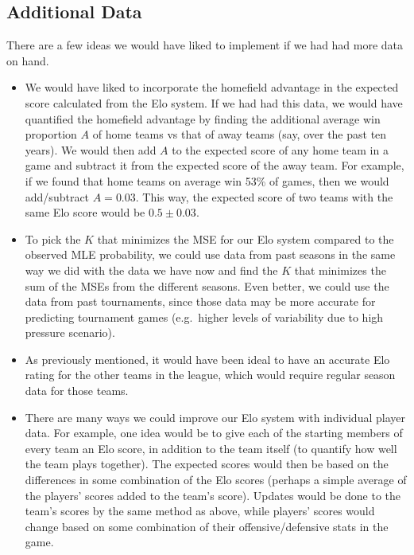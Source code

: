\documentclass{article}
\begin{document}
\subsection{Additional Data}\label{additionalData}
There are a few ideas we would have liked to implement if we had had more data on hand.
\begin{itemize}
    \item We would have liked to incorporate the homefield advantage in the expected score calculated from the Elo system. If we had had this data, we would have quantified the homefield advantage by finding the additional average win proportion $A$ of home teams vs that of away teams (say, over the past ten years). We would then add $A$ to the expected score of any home team in a game and subtract it from the expected score of the away team. For example, if we found that home teams on average win 53\% of games, then we would add/subtract $A=0.03$. This way, the expected score of two teams with the same Elo score would be $0.5 \pm 0.03$. 
    \item To pick the $K$ that minimizes the MSE for our Elo system compared to the observed MLE probability, we could use data from past seasons in the same way we did with the data we have now and find the $K$ that minimizes the sum of the MSEs from the different seasons. Even better, we could use the data from past tournaments, since those data may be more accurate for predicting tournament games (e.g.\ higher levels of variability due to high pressure scenario).
    \item As previously mentioned, it would have been ideal to have an accurate Elo rating for the other teams in the league, which would require regular season data for those teams.
    \item There are many ways we could improve our Elo system with individual player data. For example, one idea would be to give each of the starting members of every team an Elo score, in addition to the team itself (to quantify how well the team plays together). The expected scores would then be based on the differences in some combination of the Elo scores (perhaps a simple average of the players' scores added to the team's score). Updates would be done to the team's scores by the same method as above, while players' scores would change based on some combination of their offensive/defensive stats in the game.
\end{itemize}




\newpage


\end{document}
